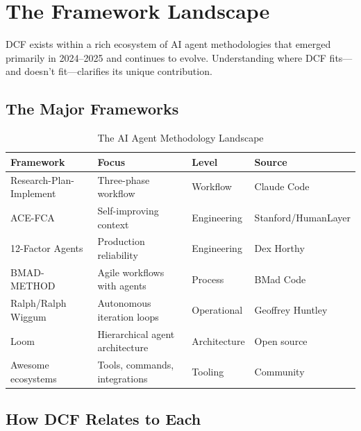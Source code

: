 \chapter{The Framework Landscape}

DCF exists within a rich ecosystem of AI agent methodologies that emerged primarily in 2024--2025 and continues to evolve. Understanding where DCF fits---and doesn't fit---clarifies its unique contribution.

\section{The Major Frameworks}

\begin{table}[H]
\centering
\small
\begin{tabular}{llll}
\toprule
\textbf{Framework} & \textbf{Focus} & \textbf{Level} & \textbf{Source} \\
\midrule
Research-Plan-Implement & Three-phase workflow & Workflow & Claude Code \\
ACE-FCA & Self-improving context & Engineering & Stanford/HumanLayer \\
12-Factor Agents & Production reliability & Engineering & Dex Horthy \\
BMAD-METHOD & Agile workflows with agents & Process & BMad Code \\
Ralph/Ralph Wiggum & Autonomous iteration loops & Operational & Geoffrey Huntley \\
Loom & Hierarchical agent architecture & Architecture & Open source \\
Awesome ecosystems & Tools, commands, integrations & Tooling & Community \\
\bottomrule
\end{tabular}
\caption{The AI Agent Methodology Landscape}
\end{table}

\section{How DCF Relates to Each}

